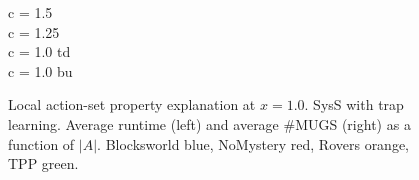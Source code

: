 \begin{figure}[htb]
\vspace{-0.0cm}
\small
\centering

c = 1.5\\

c = 1.25\\

c = 1.0 td\\

c = 1.0 bu\\

\vspace{-0.0cm}
\caption{\label{fig:appendix:asp-local} Local action-set property
  explanation at $x=1.0$. SysS with trap learning. Average runtime
  (left) and average \#MUGS (right) as a function of
  $|A|$. Blocksworld blue, NoMystery red, Rovers orange, TPP
  green.}
\vspace{-0.0cm}
\end{figure}


